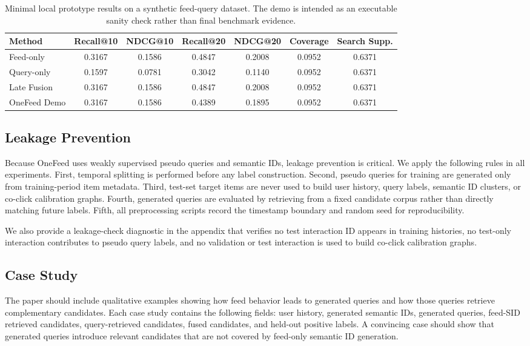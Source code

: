 \documentclass[11pt]{article}
\begin{document}
\begin{table}[t]
\centering
\caption{Minimal local prototype results on a synthetic feed-query dataset. The demo is intended as an executable sanity check rather than final benchmark evidence.}
\label{tab:demo_results}
\begin{tabular}{lcccccc}
\toprule
Method & Recall@10 & NDCG@10 & Recall@20 & NDCG@20 & Coverage & Search Supp. \\
\midrule
Feed-only & 0.3167 & 0.1586 & 0.4847 & 0.2008 & 0.0952 & 0.6371 \\
Query-only & 0.1597 & 0.0781 & 0.3042 & 0.1140 & 0.0952 & 0.6371 \\
Late Fusion & 0.3167 & 0.1586 & 0.4847 & 0.2008 & 0.0952 & 0.6371 \\
OneFeed Demo & 0.3167 & 0.1586 & 0.4389 & 0.1895 & 0.0952 & 0.6371 \\
\bottomrule
\end{tabular}
\end{table}


\subsection{Leakage Prevention}

Because OneFeed uses weakly supervised pseudo queries and semantic IDs, leakage prevention is critical. We apply the following rules in all experiments. First, temporal splitting is performed before any label construction. Second, pseudo queries for training are generated only from training-period item metadata. Third, test-set target items are never used to build user history, query labels, semantic ID clusters, or co-click calibration graphs. Fourth, generated queries are evaluated by retrieving from a fixed candidate corpus rather than directly matching future labels. Fifth, all preprocessing scripts record the timestamp boundary and random seed for reproducibility.

We also provide a leakage-check diagnostic in the appendix that verifies no test interaction ID appears in training histories, no test-only interaction contributes to pseudo query labels, and no validation or test interaction is used to build co-click calibration graphs.

\subsection{Case Study}

The paper should include qualitative examples showing how feed behavior leads to generated queries and how those queries retrieve complementary candidates. Each case study contains the following fields: user history, generated semantic IDs, generated queries, feed-SID retrieved candidates, query-retrieved candidates, fused candidates, and held-out positive labels. A convincing case should show that generated queries introduce relevant candidates that are not covered by feed-only semantic ID generation.
\end{document}
